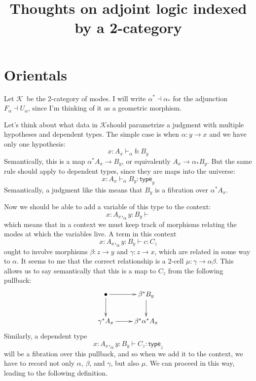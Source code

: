 \documentclass{amsart}
\title{Thoughts on adjoint logic indexed by a 2-category}
\def\type{\mathsf{type}}
\def\K{\ensuremath{\mathcal{K}}}
\theoremstyle{definition}
\begin{document}
\maketitle

\section{Orientals}
\label{sec:orientals}

Let \K\ be the 2-category of modes.
I will write $\alpha^* \dashv \alpha_*$ for the adjunction $F_\alpha \dashv U_\alpha$, since I'm thinking of it as a geometric morphism.

Let's think about what data in \K should parametrize a judgment with multiple hypotheses and dependent types.
The simple case is when $\alpha:y\to x$ and we have only one hypothesis:
\[ x:A_x \vdash_{\alpha} b : B_y \]
Semantically, this is a map $\alpha^*A_x \to B_y$, or equivalently $A_x \to \alpha_* B_y$.
But the same rule should apply to dependent types, since they are maps into the universe:
\[ x:A_x \vdash_{\alpha} B_y : \type_y \]
Semantically, a judgment like this means that $B_y$ is a fibration over $\alpha^* A_x$.

Now we should be able to add a variable of this type to the context:
\[ x:A_x ,_\alpha y:B_y \vdash \]
which means that in a context we must keep track of morphisms relating the modes at which the variables live.
A term in this context
\[ x:A_x ,_\alpha y:B_y \vdash c : C_z\]
ought to involve morphisms $\beta : z \to y$ and $\gamma: z\to x$, which are related in some way to $\alpha$.
It seems to me that the correct relationship is a 2-cell $\mu : \gamma \to \alpha \beta$.
This allows us to say semantically that this is a map to $C_z$ from the following pullback:
\begin{equation*}
  \vcenter{\xymatrix{
      \bullet \ar[r]\ar[d] &
      \beta^* B_y\ar[d]\\
      \gamma^* A_x \ar[r] &
      \beta^* \alpha^* A_x
      }}
\end{equation*}
Similarly, a dependent type
\[ x:A_x ,_\alpha y:B_y \vdash C_z :\type_z\]
will be a fibration over this pullback, and so when we add it to the context, we have to record not only $\alpha$, $\beta$, and $\gamma$, but also $\mu$.
We can proceed in this way, leading to the following definition.
\end{document}
